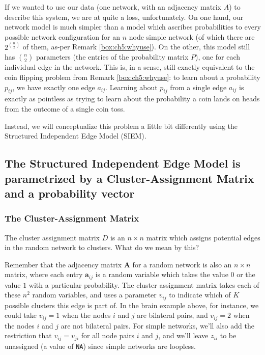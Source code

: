 If we wanted to use our data (one network, with an adjacency matrix $A$) to describe this system, we are at quite a loss, unfortunately. On one hand, our network model is much simpler than a model which ascribes probabilities to every possible network configuration for an $n$ node simple network (of which there are $2^{\binom n 2}$ of them, as-per Remark \ref{box:ch5:whyuse}). On the other, this model still has $\binom n 2$ parameters (the entries of the probability matrix $P$), one for each individual edge in the network. This is, in a sense, still exactly equivalent to the coin flipping problem from Remark \ref{box:ch5:whyuse}: to learn about a probability $p_{ij}$, we have exactly one edge $a_{ij}$. Learning about $p_{ij}$ from a single edge $a_{ij}$ is exactly as pointless as trying to learn about the probability a coin lands on heads from the outcome of a single coin toss.

Instead, we will conceptualize this problem a little bit differently using the Structured Independent Edge Model (SIEM).
\subsection{The Structured Independent Edge Model is parametrized by a Cluster-Assignment Matrix and a probability vector}
\subsubsection{The Cluster-Assignment Matrix}

The cluster assignment matrix $D$ is an $n \times n$ matrix which assigns potential edges in the random network to clusters. What do we mean by this?

Remember that the adjacency matrix $\mathbf A$ for a random network is {also} an $n \times n$ matrix, where each entry $\mathbf a_{ij}$ is a random variable which takes the value $0$ or the value $1$ with a particular probability. The cluster assignment matrix takes each of these $n^2$ random variables, and uses a parameter $v_{ij}$ to indicate which of $K$ possible clusters this edge is part of. In the brain example above, for instance, we could take $v_{ij} = 1$ when the nodes $i$ and $j$ are bilateral pairs, and $v_{ij} = 2$ when the nodes $i$ and $j$ are not bilateral pairs. For simple networks, we'll also add the restriction that $v_{ij} = v_{ji}$ for all node pairs $i$ and $j$, and we'll leave $z_{ii}$ to be unassigned (a value of \texttt{NA}) since simple networks are loopless.


